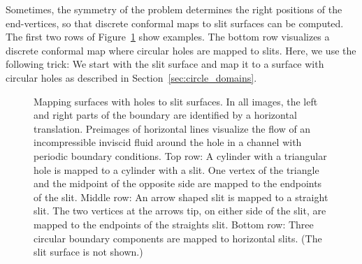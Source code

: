 \documentclass[Thesis]{subfiles}
\begin{document}
Sometimes, the symmetry of the problem determines the right positions
of the end-vertices, so that discrete conformal maps to slit surfaces
can be computed. The first two rows of Figure~\ref{fig:fluid_flows}
show examples. The bottom row visualizes a discrete conformal map
where circular holes are mapped to slits. Here, we use the following
trick: We start with the slit surface and map it to a surface with
circular holes as described in Section~\ref{sec:circle_domains}.
\begin{figure}
	\centering
        \caption{Mapping surfaces with holes to slit surfaces. In all
          images, the left and right parts of the boundary are
          identified by a horizontal translation. Preimages of
          horizontal lines visualize the flow of an incompressible
          inviscid fluid around the hole in a channel with periodic
          boundary conditions. Top row: A
          cylinder with a triangular hole is mapped to a cylinder with
          a slit. One vertex of the triangle and the midpoint of the
          opposite side are mapped to the endpoints of the
          slit. Middle row: An arrow shaped slit is mapped to a
          straight slit. The two vertices at the arrows tip, on either
          side of the slit, are mapped to the endpoints of the
          straights slit. Bottom row: Three circular boundary
          components are mapped to horizontal slits. (The slit surface
          is not shown.)}
\label{fig:fluid_flows}
\end{figure}
\end{document}
